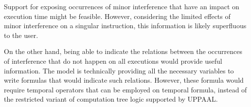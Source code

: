 Support for exposing occurrences of minor interference that have an impact on
execution time might be feasible. However, considering the limited effects of
minor interference on a singular instruction, this information is likely
superfluous to the user.

On the other hand, being able to indicate the relations between the occurrences
of interference that do not happen on all executions would provide useful
information. The model is technically providing all the necessary variables to
write formulas that would indicate such relations. However, these formula would
require temporal operators that can be employed on temporal formula, instead of
the restricted variant of computation tree logic supported by UPPAAL.
